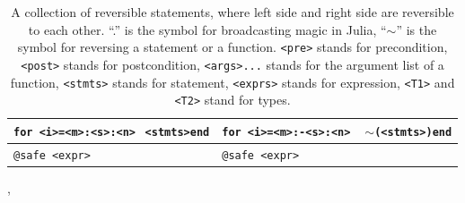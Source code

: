\documentclass[aps,twocolumn,longbibliography,english,superscriptaddress]{revtex4-1}
\newcommand{\<}{\langle}
\renewcommand{\>}{\rangle}
\newcommand{\cquad}{{{ }_{\quad}}}
\newcommand{\App}[1]{Appendix \ref{#1}}
\theoremstyle{definition}\newtheorem{definition}{\textit{Definition}}
\begin{document}
\begin{table}[h!]
\begin{minipage}{\columnwidth}
{\begin{tabularx}{\textwidth}{X X}
            \hline
            \texttt{for <i>=<m>:<s>:<n>}\newline $\cquad$\texttt{<stmts>}\newline \texttt{end} & \texttt{for <i>=<m>:-<s>:<n>}\newline $\cquad$ \texttt{$\sim$(<stmts>)}\newline \texttt{end}\\
            \hline
            \texttt{@safe <expr>} & \texttt{@safe <expr>}\\
            \bottomrule
        \end{tabularx}
    }
    \caption{A collection of reversible statements, where left side and right side are reversible to each other.
    ``.'' is the symbol for broadcasting magic in Julia,
    ``$\sim$'' is the symbol for reversing a statement or a function.
    \texttt{<pre>} stands for precondition, 
    \texttt{<post>} stands for postcondition,
    \texttt{<args>...} stands for the argument list of a function,
    \texttt{<stmts>} stands for statement,
    \texttt{<exprs>} stands for expression,
    \texttt{<T1>} and \texttt{<T2>} stand for types.
}\label{tbl:revstatements},
\end{minipage}
\end{table}

\end{document}

